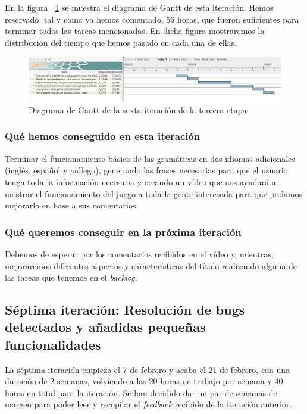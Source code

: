 En la figura ~\ref{fig:sec3it6} se muestra el diagrama de Gantt de esta iteración. Hemos reservado, tal y como ya hemos comentado, 56 horas, que fueron suficientes para terminar todas las tareas mencionadas. En dicha figura mostraremos la distribución del tiempo que hemos pasado en cada una de ellas.

\begin{figure}
    \includegraphics[width=\textwidth,height=\textheight,keepaspectratio]{./img/sec3it6.png}
  \caption{Diagrama de Gantt de la sexta iteración de la tercera etapa}
  \label{fig:sec3it6}
\end{figure}

\subsubsection{Qué hemos conseguido en esta iteración}

Terminar el funcionamiento básico de las gramáticas en dos idiomas adicionales (inglés, español y gallego), generando las frases necesarias para que el usuario tenga toda la información necesaria y creando un vídeo que nos ayudará a mostrar el funcionamiento del juego a toda la gente interesada para que podamos mejorarlo en base a sus comentarios.

\subsubsection{Qué queremos conseguir en la próxima iteración}

Debemos de esperar por los comentarios recibidos en el vídeo y, mientras, mejoraremos diferentes aspectos y características del título realizando alguna de las tareas que tenemos en el \textit{backlog}.

\subsection{Séptima iteración: Resolución de bugs detectados y añadidas pequeñas funcionalidades}

La séptima iteración empieza el 7 de febrero y acaba el 21 de febrero, con una duración de 2 semanas, volviendo a las 20 horas de trabajo por semana y 40 horas en total para la iteración. Se han decidido dar un par de semanas de margen para poder leer y recopilar el \textit{feedback} recibido de la iteración anterior.

